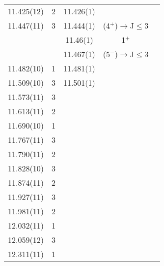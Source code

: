 \begin{center}
\begin{longtable}{cc cc c}
    11.425(12)         & 2        & 11.426(1)   &                               &               \\
    11.447(11)         & 3        & 11.444(1)   & (4$^+$)$\rightarrow$J$\leq$3  &               \\
                       &          & 11.46(1)    &        1$^+$                  &               \\
                       &          & 11.467(1)   & (5$^-$)$\rightarrow$J$\leq$3  &               \\
    11.482(10)         & 1        & 11.481(1)   &                               &               \\
    11.509(10)         & 3        & 11.501(1)   &                               &               \\
     11.573(11)        & 3        &             &                               &               \\
     11.613(11)        & 2        &             &                               &               \\
   11.690(10)          & 1        &             &                               &               \\
   11.767(11)          & 3        &             &                               &               \\
   11.790(11)          & 2        &             &                               &               \\
   11.828(10)          & 3        &             &                               &               \\
     11.874(11)        & 2        &             &                               &               \\
    11.927(11)         & 3        &             &                               &               \\
    11.981(11)         & 2        &             &                               &               \\
     12.032(11)        & 1        &             &                               &               \\
     12.059(12)        & 3        &             &                               &               \\
    12.311(11)         & 1        &             &                               &               \\




    \end{longtable}
\end{center}
